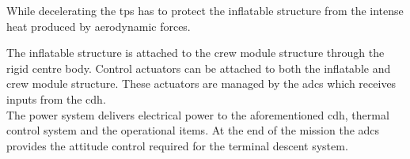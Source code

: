 While decelerating the \acrlong{tps} has to protect the inflatable structure from the intense heat produced by aerodynamic forces. %

The inflatable structure is attached to the crew module structure through the rigid centre body. Control actuators can be attached to both the inflatable and crew module structure. These actuators are managed by the \acrfull{adcs} which receives inputs from the \acrfull{cdh}.\\
The power system delivers electrical power to the aforementioned \gls{cdh}, thermal control system and the operational items. At the end of the mission the \gls{adcs} provides the attitude control required for the terminal descent system.